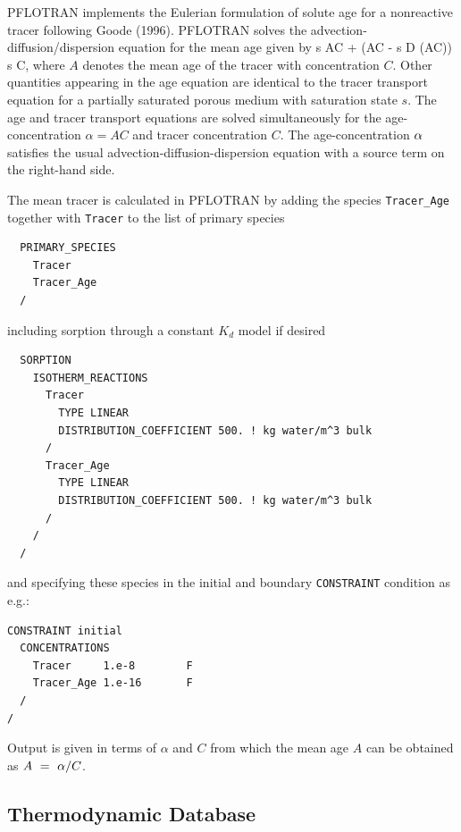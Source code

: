 PFLOTRAN implements the Eulerian formulation of solute age for a nonreactive tracer following Goode (1996). PFLOTRAN solves the advection-diffusion/dispersion equation for the mean age given by
\EQ
{} \varphi s AC + \bnabla\cdot\Big(\bq AC - \varphi s D \bnabla (AC)\Big) \eq \varphi s C,
\EN
where $A$ denotes the mean age of the tracer with concentration $C$. Other quantities appearing in the age equation are identical to the tracer transport equation for a partially saturated porous medium with saturation state $s$. The age and tracer transport equations are solved simultaneously for the age-concentration $\alpha = A C$ and tracer concentration $C$. The age-concentration ${\alpha}$ satisfies the usual advection-diffusion-dispersion equation with a source term on the right-hand side.

The mean tracer is calculated in PFLOTRAN by adding the species {\tt Tracer\_Age} together with {\tt Tracer} to the list of primary species
\begin{verbatim}
  PRIMARY_SPECIES
    Tracer
    Tracer_Age
  /
\end{verbatim}
including sorption through a constant $K_d$ model if desired
\begin{verbatim}
  SORPTION
    ISOTHERM_REACTIONS
      Tracer
        TYPE LINEAR 
        DISTRIBUTION_COEFFICIENT 500. ! kg water/m^3 bulk
      /
      Tracer_Age
        TYPE LINEAR 
        DISTRIBUTION_COEFFICIENT 500. ! kg water/m^3 bulk
      /
    /
  /
\end{verbatim}
and specifying these species in the initial and boundary {\tt CONSTRAINT} condition as e.g.:
\begin{verbatim}
CONSTRAINT initial
  CONCENTRATIONS
    Tracer     1.e-8        F
    Tracer_Age 1.e-16       F
  /
/
\end{verbatim}
Output is given in terms of $\alpha$ and $C$ from which the mean age $A$ can be obtained as $A\ =\ \alpha/C$. 

\subsection{Thermodynamic Database}
\label{thermo:database}

